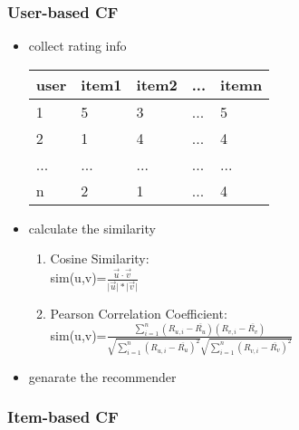 \documentclass{beamer}
\begin{document}
\begin{frame}
  \frametitle{User-based CF}

  \begin{itemize}
    \pause
  \item collect rating info \\
    \pause
    \begin{tabular}{ | l | l | l | l | l |}
      \hline
      user & item1 & item2 & ... & itemn \\
      \hline
      1 & 5 & 3 & ... & 5 \\
      \hline
      2 & 1 & 4 & ... & 4 \\
      \hline
      ... & ... & ... & ... & ... \\
      \hline
      n & 2 & 1 & ... & 4 \\
      \hline
    \end{tabular}

    \pause
  \item calculate the similarity \\
    \pause
    \begin{enumerate}
    \item Cosine Similarity: \\
      sim(u,v)=$\frac{\vec u \cdot \vec v}{\lvert \vec u \rvert * \lvert \vec v \rvert}$
    \item Pearson Correlation Coefficient: \\
      sim(u,v)=$\frac{\sum_{i=1}^{n} (R_{u,i} - \overline{R_{u}})(R_{v,i} - \overline{R_{v}})}{\sqrt{\sum_{i=1}^{n} (R_{u,i} - \overline{R_{u}})^2}\sqrt{\sum_{i=1}^{n} (R_{v,i} - \overline{R_{v}})^2}}$
    \end{enumerate}

    \pause
  \item genarate the recommender

  \end{itemize}

\end{frame}





\begin{frame}
  \frametitle{Item-based CF}


\end{frame}
\end{document}
